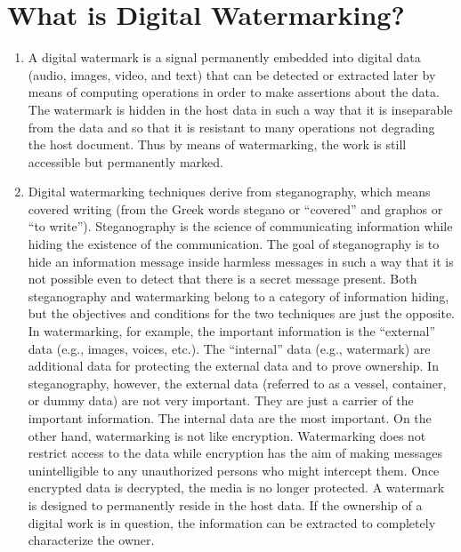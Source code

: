 \documentclass[12pt]{IEEEtran}
\begin{document}
\section{What is Digital Watermarking?}
\begin{enumerate}
\item A digital watermark is a signal permanently embedded into digital data (audio, images, video, and text) that can be detected or extracted later by means of computing operations in order to make assertions about the data. The watermark is hidden in the host data in such a way that it is inseparable from the data and so that it is resistant to many operations not degrading the host document. Thus by means of watermarking, the work is still accessible but permanently marked.

\item Digital watermarking techniques derive from steganography, which means covered writing (from the Greek words stegano or “covered” and graphos or “to write”). Steganography is the science of communicating information while hiding the existence of the communication. The goal of steganography is to hide an information message inside harmless messages in such a way that it is not possible even to detect that there is a secret message present. Both steganography and watermarking belong to a category of information hiding, but the objectives and conditions for the two techniques are just the opposite. In watermarking, for example, the important information is the “external” data (e.g., images, voices, etc.). The “internal” data (e.g., watermark) are additional data for protecting the external data and to prove ownership. In steganography, however, the external data (referred to as a vessel, container, or dummy data) are not very important. They are just a carrier of the important information. The internal data are the most important. On the other hand, watermarking is not like encryption. Watermarking does not restrict access to the data while encryption has the aim of making messages unintelligible to any unauthorized persons who might intercept them. Once encrypted data is decrypted, the media is no longer protected. A watermark is designed to permanently reside in the host data. If the ownership of a digital work is in question, the information can be extracted to completely characterize the owner.


\end{enumerate}
\end{document}
